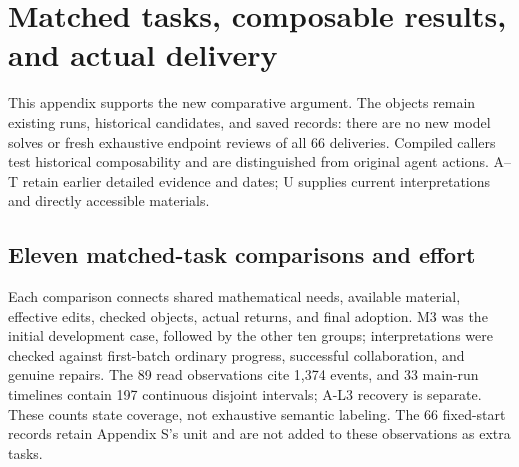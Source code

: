 \section[Matched tasks, composable results, and actual delivery]{\texorpdfstring{\protect\hypertarget{appendix-u}{}Matched tasks, composable results, and actual delivery}{Matched tasks, composable results, and actual delivery}}
This appendix supports the new comparative argument. The objects remain existing runs, historical candidates, and saved records: there are no new model solves or fresh exhaustive endpoint reviews of all 66 deliveries. Compiled callers test historical composability and are distinguished from original agent actions. A–T retain earlier detailed evidence and dates; U supplies current interpretations and directly accessible materials.

\subsection[Eleven matched-task comparisons and effort]{\texorpdfstring{\protect\hypertarget{u1}{}Eleven matched-task comparisons and effort}{Eleven matched-task comparisons and effort}}
Each comparison connects shared mathematical needs, available material, effective edits, checked objects, actual returns, and final adoption. M3 was the initial development case, followed by the other ten groups; interpretations were checked against first-batch ordinary progress, successful collaboration, and genuine repairs. The 89 read observations cite 1,374 events, and 33 main-run timelines contain 197 continuous disjoint intervals; A-L3 recovery is separate. These counts state coverage, not exhaustive semantic labeling. The 66 fixed-start records retain Appendix S's unit and are not added to these observations as extra tasks.

